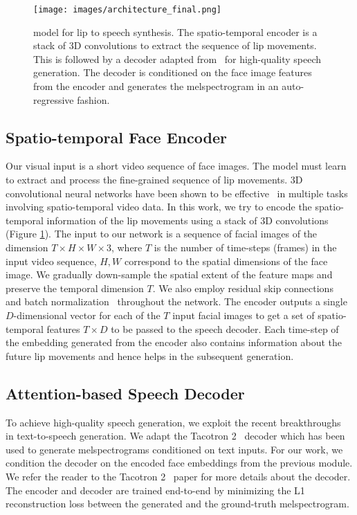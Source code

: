 \documentclass[10pt,twocolumn,letterpaper]{article}
\begin{document}
\begin{figure}[h]
  \texttt{[image: images/architecture\_final.png]}\caption{\modelname model for lip to speech synthesis. The spatio-temporal encoder is a stack of 3D convolutions to extract the sequence of lip movements. This is followed by a decoder adapted from~\cite{shen2018natural} for high-quality speech generation. The decoder is conditioned on the face image features from the encoder and generates the melspectrogram in an auto-regressive fashion.}
  \label{fig:architecture}
\end{figure}

\subsection{Spatio-temporal Face Encoder}
Our visual input is a short video sequence of face images. The model must learn to extract and process the fine-grained sequence of lip movements. 3D convolutional neural networks have been shown to be effective~\cite{ji20123d,tran2015learning,vougioukas2019video} in multiple tasks involving spatio-temporal video data. In this work, we try to encode the spatio-temporal information of the lip movements using a stack of 3D convolutions (Figure \ref{fig:architecture}). The input to our network is a sequence of facial images of the dimension $T\times H\times W\times 3$, where $T$ is the number of time-steps (frames) in the input video sequence, $H, W$ correspond to the spatial dimensions of the face image. We gradually down-sample the spatial extent of the feature maps and preserve the temporal dimension $T$. We also employ residual skip connections~\cite{he2016deep} and batch normalization~\cite{ioffe2015batch} throughout the network. The encoder outputs a single $D$-dimensional vector for each of the $T$ input facial images to get a set of spatio-temporal features $T \times D$ to be passed to the speech decoder. Each time-step of the embedding generated from the encoder also contains information about the future lip movements and hence helps in the subsequent generation.

\subsection{Attention-based Speech Decoder}
To achieve high-quality speech generation, we exploit the recent breakthroughs~\cite{shen2018natural,ping2017deep} in text-to-speech generation. We adapt the Tacotron 2~\cite{shen2018natural} decoder which has been used to generate melspectrograms conditioned on text inputs. For our work, we condition the decoder on the encoded face embeddings from the previous module. We refer the reader to the Tacotron 2~\cite{shen2018natural} paper for more details about the decoder. The encoder and decoder are trained end-to-end by minimizing the L1 reconstruction loss between the generated and the ground-truth melspectrogram. 
\end{document}
